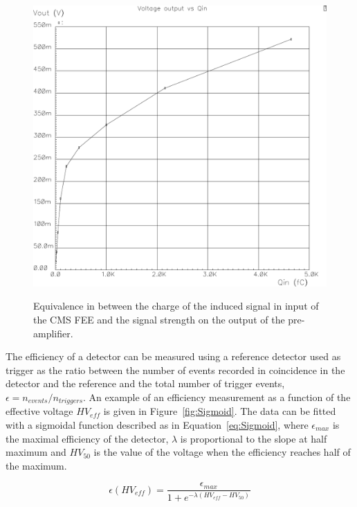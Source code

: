 \newpage
	
\begingroup\setlength{\intextsep}{0pt}\setlength{\columnsep}{15pt}
	
	\begin{figure}
		\centering
		\includegraphics[width = \linewidth]{fig/chapt3/CMS-FEE-preamp.pdf}\\
		\caption{\label{fig:CMS-FEE-preamp} Equivalence in between the charge of the induced signal in input of the CMS FEE and the signal strength on the output of the pre-amplifier.}
	\end{figure}
	
	The efficiency of a detector can be measured using a reference detector used as trigger as the ratio between the number of events recorded in coincidence in the detector and the reference and the total number of trigger events, $\epsilon = n_{events}/n_{triggers}$. An example of an efficiency measurement as a function of the effective voltage $HV_{eff}$ is given in Figure~\ref{fig:Sigmoid}. The data can be fitted with a sigmoidal function described as in Equation~\ref{eq:Sigmoid}, where $\epsilon_{max}$ is the maximal efficiency of the detector, $\lambda$ is proportional to the slope at half maximum and $HV_{50}$ is the value of the voltage when the efficiency reaches half of the maximum.
	
	\begin{equation}
	\label{eq:Sigmoid}
	\epsilon(HV_{eff}) = \frac{\epsilon_{max}}{1+e^{-\lambda(HV_{eff}-HV_{50})}}
	\end{equation}
	
